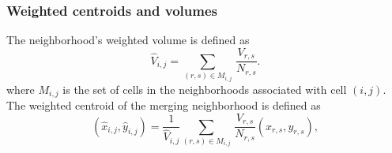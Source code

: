 %


\subsubsection*{Weighted centroids and volumes}

The neighborhood's weighted volume is defined as
\begin{equation}
\label{eqn:voldef}
{\widehat V}_{i,j} =  \sum_{(r,s) \in M_{i,j} } \,  \frac{V_{r,s}}{N_{r,s}}.
\end{equation}
where $M_{i,j}$ is the set of cells in the neighborhoods associated with cell $(i,j)$. 
The weighted centroid of the merging neighborhood is defined as
\begin{equation}
\label{eqn:centroiddef}
({\widehat x}_{i,j},{\widehat y}_{i,j}) = \frac{1}{\widehat V_{i,j}} \sum_{(r,s) \in M_{i,j} } \,  \frac{V_{r,s}}{N_{r,s}}(x_{r,s},y_{r,s}),
\end{equation}

